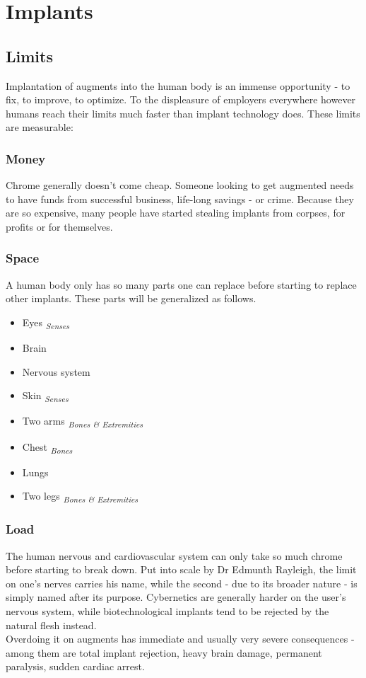 	\section{Implants}
\subsection{Limits}
Implantation of augments into the human body is an immense opportunity - to fix, to improve, to optimize. To the displeasure of employers everywhere however humans reach their limits much faster than implant technology does. These limits are measurable:
	\subsubsection{Money}
	Chrome generally doesn't come cheap. Someone looking to get augmented needs to have funds from successful business, life-long savings - or crime. Because they are so expensive, many people have started stealing implants from corpses, for profits or for themselves.
	\subsubsection{Space}
	A human body only has so many parts one can replace before starting to replace other implants. These parts will be generalized as follows.
	\begin{multicols}{2}
	\begin{itemize}
		\setlength\itemsep{-10mm}
		\item Eyes \textsubscript{\itshape Senses}
		\item Brain
		\item Nervous system
		\item Skin \textsubscript{\itshape Senses}
		\item Two arms \textsubscript{\itshape Bones \& Extremities}
		\item Chest \textsubscript{\itshape Bones}
		\item Lungs %
		\item Two legs \textsubscript{\itshape Bones \& Extremities}
	\end{itemize}
	\end{multicols}
	\subsubsection{Load}
	The human nervous and cardiovascular system can only take so much chrome before starting to break down.
	Put into scale by Dr Edmunth Rayleigh, the limit on one's nerves carries his name, while the second - due to its broader nature - is simply named after its purpose.
	Cybernetics are generally harder on the user's nervous system, while biotechnological implants tend to be rejected by the natural flesh instead.\\
	Overdoing it on augments has immediate and usually very severe consequences - among them are total implant rejection, heavy brain damage, permanent paralysis, sudden cardiac arrest.
